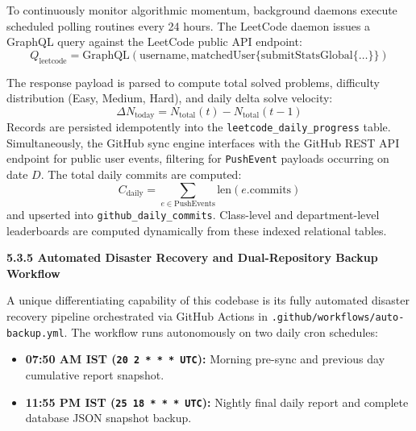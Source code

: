{To continuously monitor algorithmic momentum, background daemons execute scheduled polling routines every 24 hours. The LeetCode daemon issues a GraphQL query against the LeetCode public API endpoint:
\begin{equation}
Q_{\text{leetcode}} = \text{GraphQL}(\text{username}, \text{matchedUser}\{\text{submitStatsGlobal}\{\dots\}\}) \tag{6}
\end{equation}

The response payload is parsed to compute total solved problems, difficulty distribution (Easy, Medium, Hard), and daily delta solve velocity:
\begin{equation}
\Delta N_{\text{today}} = N_{\text{total}}(t) - N_{\text{total}}(t - 1) \tag{7}
\end{equation}
Records are persisted idempotently into the \texttt{leetcode\_daily\_progress} table. Simultaneously, the GitHub sync engine interfaces with the GitHub REST API endpoint for public user events, filtering for \texttt{PushEvent} payloads occurring on date $D$. The total daily commits are computed:
\begin{equation}
C_{\text{daily}} = \sum_{e \in \text{PushEvents}} \text{len}(e.\text{commits}) \tag{8}
\end{equation}
and upserted into \texttt{github\_daily\_commits}. Class-level and department-level leaderboards are computed dynamically from these indexed relational tables.

\vspace{0.4cm}
{\fontsize{13pt}{17pt}\selectfont\bfseries 5.3.5 Automated Disaster Recovery and Dual-Repository Backup Workflow\par}
\vspace{0.2cm}

A unique differentiating capability of this codebase is its fully automated disaster recovery pipeline orchestrated via GitHub Actions in \texttt{.github/workflows/auto-backup.yml}. The workflow runs autonomously on two daily cron schedules:
\begin{itemize}[noitemsep,topsep=2pt,leftmargin=*]
  \item \textbf{07:50 AM IST (\texttt{20 2 * * * UTC}):} Morning pre-sync and previous day cumulative report snapshot.
  \item \textbf{11:55 PM IST (\texttt{25 18 * * * UTC}):} Nightly final daily report and complete database JSON snapshot backup.
\end{itemize}

}
